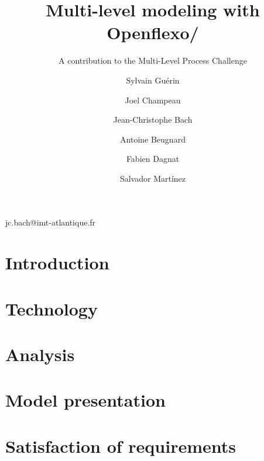 \documentclass[american]{emisa}
\newcommand{\mpc}{MULTI process challenge\xspace}%
\newcommand{\mlpc}{Multi-Level Process Challenge\xspace}
\begin{document}
\begin{article}{
    \title{Multi-level modeling with Openflexo/\FML}
    \subtitle{A contribution to the \mlpc} %

    \author{Sylvain Guérin}%
    \address{ENSTA Bretagne, Lab-STICC, UMR 6285, Brest, France}

    \author{Joel Champeau}
    \address[a]{}

    \author*{Jean-Christophe Bach}{jc.bach@imt-atlantique.fr}
    \address{IMT Atlantique, Lab-STICC, UMR 6285, Brest, France}

    \author{Antoine Beugnard}
    \address[b]{}

    \author{Fabien Dagnat}
    \address[b]{}

    \author{Salvador Mart\'inez}
    \address[b]{}

    \abstract{}
    
}

\section{Introduction}
\label{sec:introduction}



\section{Technology}
\label{sec:technology}


\section{Analysis}
\label{sec:analysis}


\section{Model presentation}
\label{sec:model}


\section{Satisfaction of requirements}
\label{sec:requirements}



\end{article}
\end{document}
